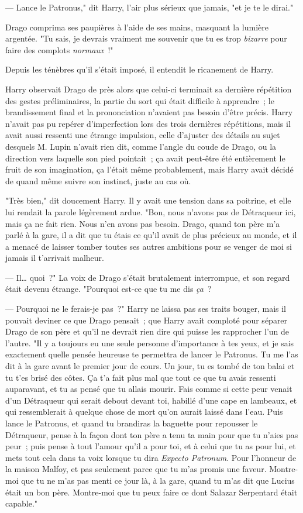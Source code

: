 --- Lance le Patronus," dit Harry, l'air plus sérieux que jamais, "et je te le dirai."

Drago comprima ses paupières à l'aide de ses mains, masquant la lumière argentée. "Tu sais, je devrais vraiment me souvenir que tu es trop \emph{bizarre} pour faire des complots \emph{normaux}~!"

Depuis les ténèbres qu'il s'était imposé, il entendit le ricanement de Harry.

\later

Harry observait Drago de près alors que celui-ci terminait sa dernière répétition des gestes préliminaires, la partie du sort qui était difficile à apprendre~; le brandissement final et la prononciation n'avaient pas besoin d'être précis. Harry n'avait pas pu repérer d'imperfection lors des trois dernières répétitions, mais il avait aussi ressenti une étrange impulsion, celle d'ajuster des détails au sujet desquels M. Lupin n'avait rien dit, comme l'angle du coude de Drago, ou la direction vers laquelle son pied pointait~; ça avait peut-être été entièrement le fruit de son imagination, ça l'était même probablement, mais Harry avait décidé de quand même suivre son instinct, juste au cas où.

"Très bien," dit doucement Harry. Il y avait une tension dans sa poitrine, et elle lui rendait la parole légèrement ardue. "Bon, nous n'avons pas de Détraqueur ici, mais ça ne fait rien. Nous n'en avons pas besoin. Drago, quand ton père m'a parlé à la gare, il a dit que tu étais ce qu'il avait de plus précieux au monde, et il a menacé de laisser tomber toutes ses autres ambitions pour se venger de moi si jamais il t'arrivait malheur.

--- Il… quoi~?" La voix de Drago s'était brutalement interrompue, et son regard était devenu étrange. "Pourquoi est-ce que tu me dis \emph{ça}~?

--- Pourquoi ne le ferais-je pas~?" Harry ne laissa pas ses traits bouger, mais il pouvait deviner ce que Drago pensait~; que Harry avait comploté pour séparer Drago de son père et qu'il ne devrait rien dire qui puisse les rapprocher l'un de l'autre. "Il y a toujours eu une seule personne d'importance à tes yeux, et je sais exactement quelle pensée heureuse te permettra de lancer le Patronus. Tu me l'as dit à la gare avant le premier jour de cours. Un jour, tu es tombé de ton balai et tu t'es brisé des côtes. Ça t'a fait plus mal que tout ce que tu avais ressenti auparavant, et tu as pensé que tu allais mourir. Fais comme si cette peur venait d'un Détraqueur qui serait debout devant toi, habillé d'une cape en lambeaux, et qui ressemblerait à quelque chose de mort qu'on aurait laissé dans l'eau. Puis lance le Patronus, et quand tu brandiras la baguette pour repousser le Détraqueur, pense à la façon dont ton père a tenu ta main pour que tu n'aies pas peur~; puis pense à tout l'amour qu'il a pour toi, et à celui que tu as pour lui, et mets tout cela dans ta voix lorsque tu dira \emph{Expecto Patronum}. Pour l'honneur de la maison Malfoy, et pas seulement parce que tu m'as promis une faveur. Montre-moi que tu ne m'as pas menti ce jour là, à la gare, quand tu m'as dit que Lucius était un bon père. Montre-moi que tu peux faire ce dont Salazar Serpentard était capable."

